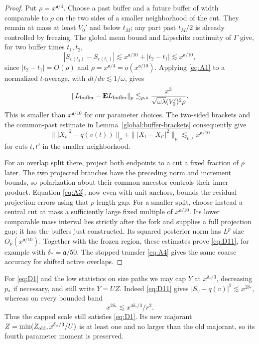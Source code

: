 \begin{proof}
Put $\rho=x^{\mathfrak a/4}$.  Choose a past buffer and a future
buffer of width comparable to $\rho$ on the two sides of a smaller
neighborhood of the cut.  They remain at mass at least $V_0'$ and
below $t_M$; any part past $t_M/2$ is already controlled by freezing.
The global mean bound and Lipschitz continuity of $\Gamma$ give,
for two buffer times $t_1,t_2$,
\[
 |S_{v(t_2)}-S_{v(t_1)}|
 \lesssim x^{\mathfrak a/10}+|t_2-t_1|
 \lesssim x^{\mathfrak a/10},
\]
since $|t_2-t_1|=O(\rho)$ and $\rho=x^{\mathfrak a/4}
=o(x^{\mathfrak a/10})$.  Applying \eqref{eq:A1} to a
normalized $t$-average, with $dt/dv\lesssim1/\omega$, gives
\[
 \|L_{\rm buffer}-\mathbf EL_{\rm buffer}\|_p
 \lesssim_{p,\circ}
       \frac{x^3}{\sqrt{\omega\lambda}(V_0')^2\rho}.
\]
This is smaller than $x^{\mathfrak a/10}$ for our parameter choices.
The two-sided brackets and the common-past estimate in
Lemma~\ref{global:buffer-brackets} consequently give
\[
 \||X_t|^2-q(v(t))\|_p
       +\||X_t-X_{t'}|^2\|_p
       \lesssim_{p,\circ}x^{\mathfrak a/10}
\]
for cuts $t,t'$ in the smaller neighborhood.

For an overlap split there, project both endpoints to a cut a fixed
fraction of $\rho$ later.  The two projected branches have the preceding
norm and increment bounds, so polarization about their common ancestor
controls their inner product.  Equation \eqref{eq:A3}, now even with
unit anchors, bounds the residual projection errors using that
$\rho$-length gap.  For a smaller split, choose instead a central cut
at mass a sufficiently large fixed multiple of $x^{\mathfrak a/10}$.
Its lower comparable mass interval lies strictly after the fork and
supplies a full projection gap; it has the buffers just constructed.
Its squared posterior norm has $L^p$ size $O_p(x^{\mathfrak a/10})$.
Together with the frozen region, these estimates prove \eqref{eq:D11},
for example with $\delta_*=\mathfrak a/50$.  The stopped transfer
\eqref{eq:A4} gives the same coarse accuracy for shifted active overlaps.
\end{proof}

\begin{corollary}\label{cor:statistics-cap}
For \eqref{eq:D1} and the low statistics on size paths we may cap
$Y$ at $x^{\delta_*/3}$, decreasing $p_*$ if necessary, and still write
$Y=UZ$.  Indeed \eqref{eq:D11} gives
$|S_v-q(v)|^2\lesssim x^{2\delta_*}$, whereas on every bounded band
\[
 x^{2\delta_*}\lesssim x^{4\delta_*/3}/r^2.
\]
Thus the capped scale still satisfies \eqref{eq:D1}.  Its new majorant
$Z=\min(Z_{\rm old},x^{\delta_*/3}/U)$ is at least one and no larger
than the old majorant, so its fourth parameter moment is preserved.


\end{corollary}

